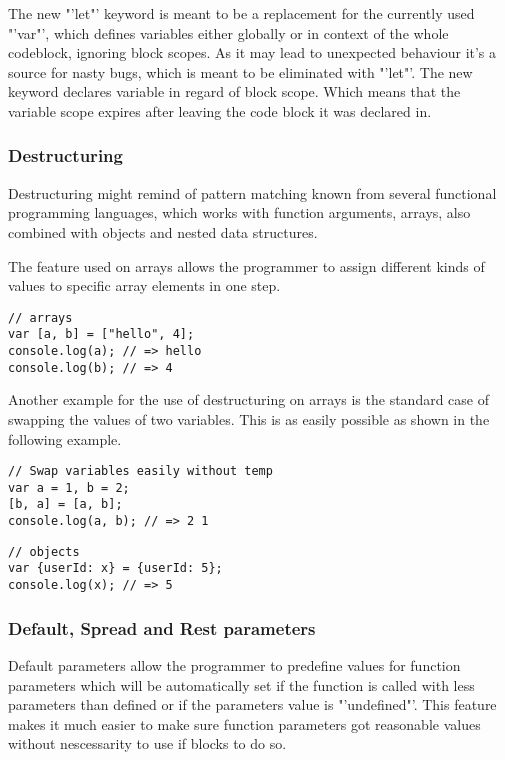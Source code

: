 \documentclass{bioinfo}
\begin{document}
The new "'let"' keyword is meant to be a replacement for the currently used "'var"', which defines variables 
either globally or in context of the whole codeblock, ignoring block scopes. As it may lead to unexpected behaviour
it's a source for nasty bugs, which is meant to be eliminated with "'let"'. The new keyword declares variable in 
regard of block scope. Which means that the variable scope expires after leaving the code block it was declared in.


\subsubsection{Destructuring}
Destructuring might remind of pattern matching known from several functional programming languages, which works with function arguments,
arrays, also combined with objects and nested data structures.

The feature used on arrays allows the programmer to assign different kinds of values to specific array elements in one step.
\begin{lstlisting}[caption= My Javascript Example]
// arrays
var [a, b] = ["hello", 4];
console.log(a); // => hello
console.log(b); // => 4
\end{lstlisting}

Another example for the use of destructuring on arrays is the standard case of swapping the values of two variables.
This is as easily possible as shown in the following example.
\begin{lstlisting}[caption= My Javascript Example]
// Swap variables easily without temp
var a = 1, b = 2;
[b, a] = [a, b];
console.log(a, b); // => 2 1
\end{lstlisting}


\begin{lstlisting}[caption= My Javascript Example]
// objects
var {userId: x} = {userId: 5};
console.log(x); // => 5
\end{lstlisting}

\subsubsection{Default, Spread and Rest parameters}
Default parameters allow the programmer to predefine values for function parameters which will be automatically
set if the function is called with less parameters than defined or if the parameters value is "'undefined"'.
This feature makes it much easier to make sure function parameters got reasonable values without nescessarity to
use if blocks to do so.
\end{document}
